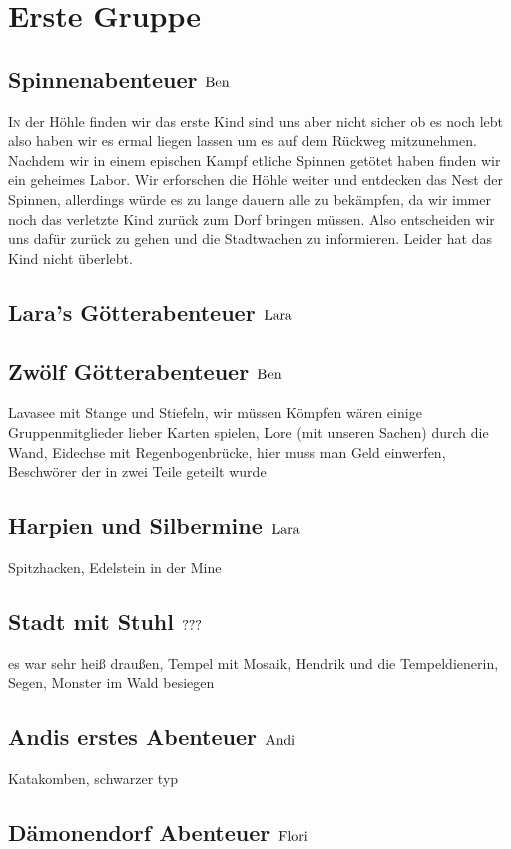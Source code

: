 \chapter{Erste Gruppe}
\section{Spinnenabenteuer \hfill $\rm{Ben}$}
\lettrine{I}{n} der H\"ohle finden wir das erste Kind sind uns aber nicht sicher ob es noch lebt also haben wir es ermal liegen lassen um es auf dem R\"uckweg mitzunehmen. Nachdem wir in einem epischen Kampf etliche Spinnen get\"otet haben finden wir ein geheimes Labor. Wir erforschen die H\"ohle weiter und entdecken das Nest der Spinnen, allerdings w\"urde es zu lange dauern alle zu bek\"ampfen, da wir immer noch das verletzte Kind zur\"uck zum Dorf bringen m\"ussen. Also entscheiden wir uns daf\"ur zur\"uck zu gehen und die Stadtwachen zu informieren. Leider hat das Kind nicht \"uberlebt.

\section{Lara's G\"otterabenteuer \hfill $\rm{Lara}$}
\section{Zw\"olf G\"otterabenteuer \hfill $\rm{Ben}$}
Lavasee mit Stange und Stiefeln, wir müssen Kömpfen wären einige Gruppenmitglieder lieber Karten spielen, Lore (mit unseren Sachen) durch die Wand, Eidechse mit Regenbogenbr\"ucke, hier muss man Geld einwerfen, Beschwörer der in zwei Teile geteilt wurde
\section{Harpien und Silbermine \hfill $\rm{Lara}$}
Spitzhacken, Edelstein in der Mine
\section{Stadt mit Stuhl \hfill $\rm{???}$}
es war sehr heiß draußen, Tempel mit Mosaik, Hendrik und die Tempeldienerin, Segen, Monster im Wald besiegen
\section{Andis erstes Abenteuer \hfill $\rm{Andi}$}
Katakomben, schwarzer typ
\section{D\"amonendorf Abenteuer \hfill $\rm{Flori}$}
